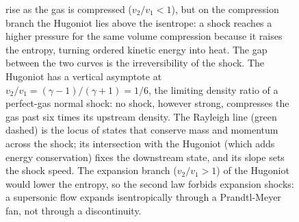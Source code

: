 \begin{figure}[htbp]
{rise as the gas is compressed ($v_2/v_1<1$), but on the compression
branch the Hugoniot lies above the isentrope: a shock reaches a higher
pressure for the same volume compression because it raises the entropy,
turning ordered kinetic energy into heat. The gap between the two curves
is the irreversibility of the shock. The Hugoniot has a vertical
asymptote at $v_2/v_1=(\gamma-1)/(\gamma+1)=1/6$, the limiting density
ratio of a perfect-gas normal shock: no shock, however strong,
compresses the gas past six times its upstream density. The Rayleigh
line (green dashed) is the locus of states that conserve mass and
momentum across the shock; its intersection with the Hugoniot (which
adds energy conservation) fixes the downstream state, and its slope sets
the shock speed. The expansion branch ($v_2/v_1>1$) of the Hugoniot
would lower the entropy, so the second law forbids expansion shocks: a
supersonic flow expands isentropically through a Prandtl-Meyer fan, not
through a discontinuity.}
\label{fig:vol03ch13:hugoniot}
\end{figure}
